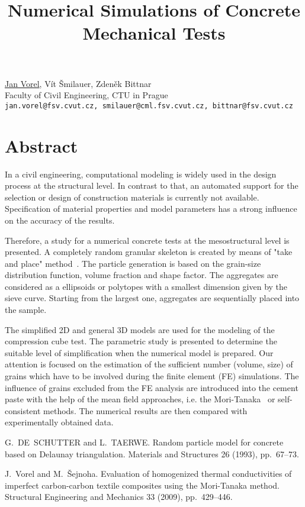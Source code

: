 \title{Numerical Simulations of Concrete Mechanical Tests}
\author{} \institute{}
\maketitle

\begin{center}
{\large \underline{Jan Vorel}, V\'{i}t \v{S}milauer, Zden\v{e}k Bittnar}\\
Faculty of Civil Engineering, CTU in Prague\\
{\tt jan.vorel@fsv.cvut.cz, smilauer@cml.fsv.cvut.cz, bittnar@fsv.cvut.cz}
\end{center}

\section*{Abstract}
In a civil engineering, computational modeling is widely used in the design process at the structural level. In contrast to that, an automated support for the selection or design of construction materials is currently not available. Specification of material properties and model parameters has a strong influence on the accuracy of the results.

Therefore, a study for a numerical concrete tests at the mesostructural level is presented. A completely random granular skeleton is created by means of "take and place" method~\cite{Shutter:1993:RPC}. The particle generation is based on the grain-size distribution function, volume fraction and shape factor. The aggregates are considered as a ellipsoids or polytopes with a smallest dimension given by the sieve curve. Starting from the largest one, aggregates are sequentially placed into the sample.

The simplified 2D and general 3D models are used for the modeling of the compression cube test. The parametric study is presented to determine the suitable level of simplification when the numerical model is prepared. Our attention is focused on the estimation of the sufficient number (volume, size) of grains which have to be involved during the finite element (FE) simulations. The influence of grains excluded from the FE analysis are introduced into the cement paste with the help of the mean field approaches, i.e. the Mori-Tanaka~\cite{Vorel:2009:EHTC} or self-consistent methods. The numerical results are then compared with experimentally obtained data.


\begin{thebibliography}{10}
{\sc G.~DE~SCHUTTER and L.~TAERWE}. {Random particle model for concrete based on Delaunay
triangulation}. Materials and Structures 26 (1993), pp.~67--73.

{\sc J.~Vorel and M.~\v{S}ejnoha}. {Evaluation of homogenized thermal conductivities of imperfect carbon-carbon textile composites using the Mori-Tanaka method}. Structural Engineering and Mechanics 33 (2009), pp.~429--446.
\end{thebibliography}